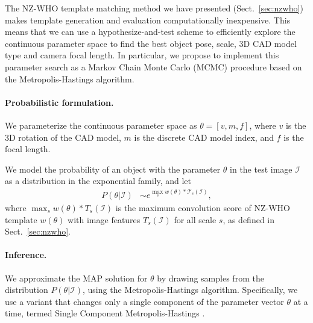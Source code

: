 The NZ-WHO template matching method we have presented
(Sect.~\ref{sec:nzwho}) makes template generation and evaluation
computationally inexpensive. This means that we can use a
hypothesize-and-test scheme to efficiently explore the continuous
parameter space to find the best object pose, scale, 3D CAD model type
and camera focal length.
%
In particular, we propose to implement this parameter search as a
Markov Chain Monte Carlo (MCMC) procedure based on the
Metropolis-Hastings algorithm.

\paragraph{Probabilistic formulation.}
We parameterize the continuous parameter space as  $\theta = [v, m, f]$,
where $v$ is the 3D rotation of the CAD model, $m$ is the discrete CAD
model index, and $f$ is the focal length.

We model the probability of an object with the parameter $\theta$ in the test
image $\mathcal{I}$ as a distribution in the exponential family, and let
\begin{align}
    P(\theta| \mathcal{I}) & \sim e^{ \max_{s} w(\theta) \ast \mathcal{T}_s(\mathcal{I})},
\end{align}
where $\max_{s} w(\theta) \ast T_s(\mathcal{I})$ is the maximum convolution score of
NZ-WHO template $w(\theta)$ with image features $T_s(\mathcal{I})$ for all scale
$s$, as defined in Sect.~\ref{sec:nzwho}.

\paragraph{Inference.}
We approximate the MAP solution for $\theta$ by drawing samples from the
distribution $P(\theta | \mathcal{I})$, using the Metropolis-Hastings
algorithm. Specifically, we use a variant that changes only a single
component of the parameter vector $\theta$ at a time, termed Single
Component Metropolis-Hastings \cite{mcmc}.


